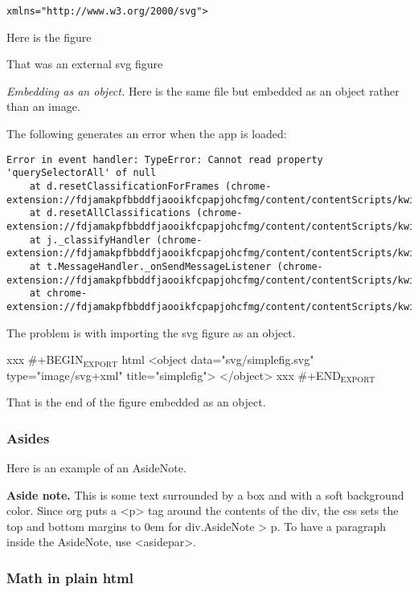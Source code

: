 \documentclass[11pt]{article}
\begin{document}
\begin{verbatim}
xmlns="http://www.w3.org/2000/svg">
\end{verbatim}

Here is the figure

That was an external svg figure

\emph{Embedding as an object.}  Here is the same file but embedded as an
object rather than an image.

The following generates an error when the app is loaded:

\begin{verbatim}
Error in event handler: TypeError: Cannot read property 'querySelectorAll' of null
    at d.resetClassificationForFrames (chrome-extension://fdjamakpfbbddfjaooikfcpapjohcfmg/content/contentScripts/kwift.CHROME.min.js:1:46879)
    at d.resetAllClassifications (chrome-extension://fdjamakpfbbddfjaooikfcpapjohcfmg/content/contentScripts/kwift.CHROME.min.js:1:46056)
    at j._classifyHandler (chrome-extension://fdjamakpfbbddfjaooikfcpapjohcfmg/content/contentScripts/kwift.CHROME.min.js:17:83684)
    at t.MessageHandler._onSendMessageListener (chrome-extension://fdjamakpfbbddfjaooikfcpapjohcfmg/content/contentScripts/kwift.CHROME.min.js:17:152024)
    at chrome-extension://fdjamakpfbbddfjaooikfcpapjohcfmg/content/contentScripts/kwift.CHROME.min.js:17:151660
\end{verbatim}

The problem is with importing the svg figure as an object.

xxx \#+BEGIN\(_{\text{EXPORT}}\) html
<object data="svg/simplefig.svg" type="image/svg+xml"
title="simplefig">
</object>
xxx \#+END\(_{\text{EXPORT}}\)

That is the end of the figure embedded as an object.

\subsubsection*{Asides}
\label{sec:orgb852952}

Here is an example of an AsideNote.

\textbf{Aside note.} This is some text surrounded by a box and with a soft
background color.  Since org puts a <p> tag around the contents of the
div, the css sets the top and bottom margins to 0em for div.AsideNote
> p.
To have a paragraph inside the AsideNote, use <asidepar>.

\subsubsection*{Math in plain html}
\label{sec:orgfbb0ac0}
\end{document}
